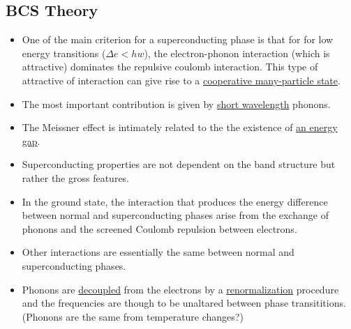 \documentclass[11pt,letterpaper]{article}
\begin{document}
\subsection*{BCS Theory}
\begin{itemize}
    \item One of the main criterion for a superconducting phase is that for for low energy transitions
    \newline($\Delta e < hw$), the electron-phonon interaction (which is attractive) dominates the repulsive coulomb interaction.
     This type of attractive of interaction can give rise to a \underline{cooperative many-particle state}.
    \item The most important contribution is given by \underline{short wavelength} phonons.
    \item The Meissner effect is intimately related to the the existence of \underline{an energy gap}.
    \item Superconducting properties are not dependent on the band structure but rather the gross features.
    \item In the ground state, the interaction that produces the energy difference between normal and superconducting phases arise from the exchange of phonons and the screened Coulomb repulsion between electrons.
    \item Other interactions are essentially the same between normal and superconducting phases.
    \item Phonons are \underline{decoupled} from the electrons by a \underline{renormalization} procedure and the frequencies are though to be unaltared between phase transititions. (Phonons are the same from temperature changes?)

\end{itemize}
\end{document}
